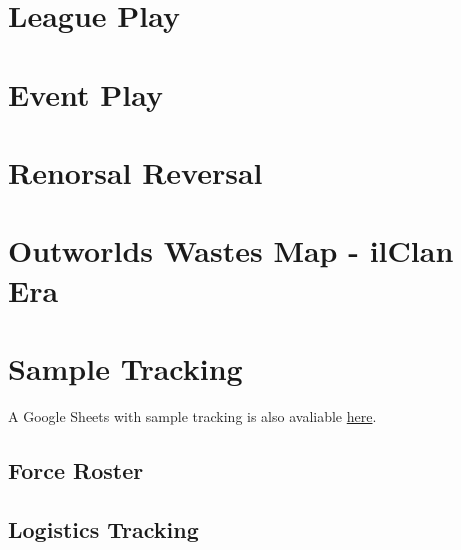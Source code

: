 \documentclass{article}
\newcommand{\mysectiontitle}{}
\newcommand{\newsection}[2]{\renewcommand{\mysectiontitle}{#2}\section{#1}}
\begin{document}


\newpage

\newsection{League Play}{league-play}
\label{sec:league_play}



\newpage

\newsection{Event Play}{event-play}
\label{sec:event_play}



\newpage

\newsection{Renorsal Reversal}{short-story}



\newpage

\newsection{Outworlds Wastes Map - ilClan Era}{outworlds-wastes-map}
\label{sec:outworlds_wastes_map}



\newpage

\newsection{Sample Tracking}{sample-tracking}
\label{sec:sample_tracking}

A Google Sheets with sample tracking is also avaliable \href{https://docs.google.com/spreadsheets/d/1uGSthgyHZNMcxrVl6FJjIguesnTC9MTuP-9ow939Quw}{here}.

\subsection{Force Roster}



\subsection{Logistics Tracking}
\end{document}
